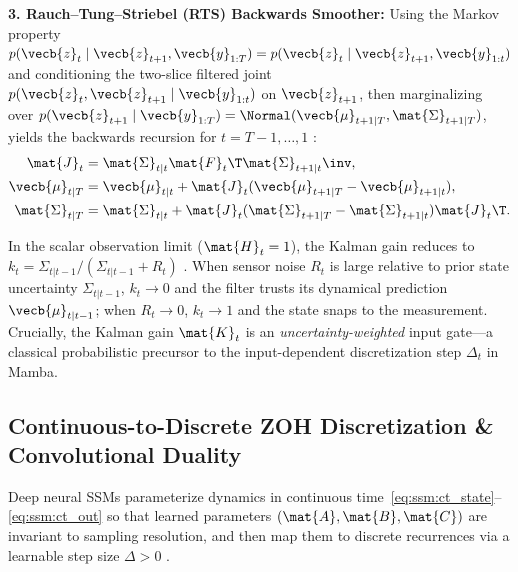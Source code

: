\documentclass[../../../../master.tex]{subfiles}
\begin{document}
\begin{coremath}
\textbf{3. Rauch--Tung--Striebel (RTS) Backwards Smoother:} Using the Markov property $p(\vecb{z}_t \mid \vecb{z}_{t+1}, \vecb{y}_{1:T}) = p(\vecb{z}_t \mid \vecb{z}_{t+1}, \vecb{y}_{1:t})$ and conditioning the two-slice filtered joint $p(\vecb{z}_t, \vecb{z}_{t+1} \mid \vecb{y}_{1:t})$ on $\vecb{z}_{t+1}$, then marginalizing over $p(\vecb{z}_{t+1} \mid \vecb{y}_{1:T}) = \Normal(\vecb{\mu}_{t+1|T}, \mat{\Sigma}_{t+1|T})$, yields the backwards recursion for $t = T-1,\dots,1$ :
\begin{align}
  \mat{J}_t &= \mat{\Sigma}_{t|t} \mat{F}_t\T \mat{\Sigma}_{t+1|t}\inv, \label{eq:ssm:rts_gain} \\
  \vecb{\mu}_{t|T} &= \vecb{\mu}_{t|t} + \mat{J}_t (\vecb{\mu}_{t+1|T} - \vecb{\mu}_{t+1|t}), \label{eq:ssm:rts_mean} \\
  \mat{\Sigma}_{t|T} &= \mat{\Sigma}_{t|t} + \mat{J}_t (\mat{\Sigma}_{t+1|T} - \mat{\Sigma}_{t+1|t})\mat{J}_t\T. \label{eq:ssm:rts_cov}
\end{align}
\end{coremath}

\begin{intuition}
In the scalar observation limit ($\mat{H}_t = 1$), the Kalman gain reduces to $k_t = \Sigma_{t|t-1} / (\Sigma_{t|t-1} + R_t)$ . When sensor noise $R_t$ is large relative to prior state uncertainty $\Sigma_{t|t-1}$, $k_t \to 0$ and the filter trusts its dynamical prediction $\vecb{\mu}_{t|t-1}$; when $R_t \to 0$, $k_t \to 1$ and the state snaps to the measurement. Crucially, the Kalman gain $\mat{K}_t$ is an \emph{uncertainty-weighted} input gate---a classical probabilistic precursor to the input-dependent discretization step $\Delta_t$ in Mamba.
\end{intuition}

\subsection{Continuous-to-Discrete ZOH Discretization \& Convolutional Duality}

Deep neural SSMs parameterize dynamics in continuous time~\eqref{eq:ssm:ct_state}--\eqref{eq:ssm:ct_out} so that learned parameters $(\mat{A}, \mat{B}, \mat{C})$ are invariant to sampling resolution, and then map them to discrete recurrences via a learnable step size $\Delta > 0$ .
\end{document}
